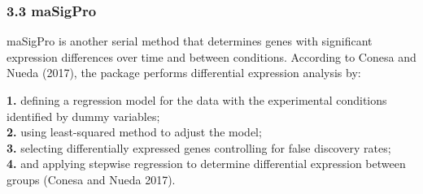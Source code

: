 \documentclass[]{article}
\begin{document}
\subsubsection{\texorpdfstring{\textbf{3.3}
maSigPro}{3.3 maSigPro}}\label{masigpro}

maSigPro is another serial method that determines genes with significant
expression differences over time and between conditions. According to
Conesa and Nueda (2017), the package performs differential expression
analysis by:

\textbf{1.} defining a regression model for the data with the
experimental conditions identified by dummy variables;\\
\textbf{2.} using least-squared method to adjust the model;\\
\textbf{3.} selecting differentially expressed genes controlling for
false discovery rates;\\
\textbf{4.} and applying stepwise regression to determine differential
expression between groups (Conesa and Nueda 2017).
\end{document}
